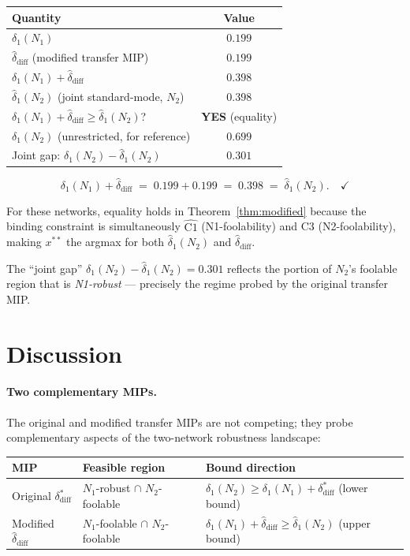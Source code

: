 \documentclass[12pt]{article}
\theoremstyle{definition}
\theoremstyle{plain}
\theoremstyle{remark}
\newcommand{\dN}[1]{\delta_1(N_{#1})}
\newcommand{\dNmod}[1]{\hat{\delta}_1(N_{#1})}
\newcommand{\ddiff}{\delta_{\mathrm{diff}}^{*}}
\newcommand{\ddiffmod}{\hat{\delta}_{\mathrm{diff}}}
\begin{document}
\begin{center}
\renewcommand{\arraystretch}{1.5}
\begin{tabular}{lc}
\toprule
Quantity & Value \\
\midrule
$\dN{1}$ & $0.199$ \\
$\ddiffmod$ (modified transfer MIP) & $0.199$ \\
$\dN{1}+\ddiffmod$ & $\mathbf{0.398}$ \\
\midrule
$\dNmod{2}$ (joint standard-mode, $N_2$) & $\mathbf{0.398}$ \\
\midrule
$\dN{1}+\ddiffmod\geq\dNmod{2}$? & \textbf{YES} (equality) \\
\midrule\midrule
$\dN{2}$ (unrestricted, for reference) & $0.699$ \\
Joint gap: $\dN{2}-\dNmod{2}$ & $0.301$ \\
\bottomrule
\end{tabular}
\end{center}

\[
  \dN{1}+\ddiffmod
  \;=\; 0.199+0.199
  \;=\; 0.398
  \;=\; \dNmod{2}.
  \quad\checkmark
\]

For these networks, equality holds in Theorem~\ref{thm:modified}
because the binding constraint is simultaneously $\widehat{\mathrm{C1}}$
(N1-foolability) and C3 (N2-foolability), making $x^{**}$ the
argmax for both $\dNmod{2}$ and $\ddiffmod$.

The ``joint gap'' $\dN{2}-\dNmod{2}=0.301$ reflects the portion of $N_2$'s
foolable region that is \emph{N1-robust} — precisely the regime probed
by the original transfer MIP.

\section{Discussion}\label{sec:discussion}

\paragraph{Two complementary MIPs.}
The original and modified transfer MIPs are not competing; they probe
complementary aspects of the two-network robustness landscape:

\begin{center}
\renewcommand{\arraystretch}{1.3}
\begin{tabular}{lll}
\toprule
MIP & Feasible region & Bound direction \\
\midrule
Original $\ddiff$ & $N_1$-robust $\cap$ $N_2$-foolable & $\dN{2}\geq\dN{1}+\ddiff$ (lower bound) \\
Modified $\ddiffmod$ & $N_1$-foolable $\cap$ $N_2$-foolable & $\dN{1}+\ddiffmod\geq\dNmod{2}$ (upper bound) \\
\bottomrule
\end{tabular}
\end{center}
\end{document}
